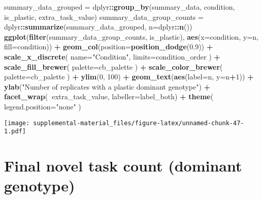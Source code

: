 \documentclass[]{book}
\newenvironment{Shaded}{\begin{snugshade}}{\end{snugshade}}
\newcommand{\DataTypeTok}[1]{\textcolor[rgb]{0.13,0.29,0.53}{#1}}
\newcommand{\DecValTok}[1]{\textcolor[rgb]{0.00,0.00,0.81}{#1}}
\newcommand{\FloatTok}[1]{\textcolor[rgb]{0.00,0.00,0.81}{#1}}
\newcommand{\KeywordTok}[1]{\textcolor[rgb]{0.13,0.29,0.53}{\textbf{#1}}}
\newcommand{\NormalTok}[1]{#1}
\newcommand{\OperatorTok}[1]{\textcolor[rgb]{0.81,0.36,0.00}{\textbf{#1}}}
\newcommand{\StringTok}[1]{\textcolor[rgb]{0.31,0.60,0.02}{#1}}
\begin{document}
\begin{Shaded}
\begin{Highlighting}[]
\NormalTok{summary_data_grouped =}\StringTok{ }\NormalTok{dplyr}\OperatorTok{::}\KeywordTok{group_by}\NormalTok{(summary_data, condition, is_plastic, extra_task_value)}
\NormalTok{summary_data_group_counts =}\StringTok{ }\NormalTok{dplyr}\OperatorTok{::}\KeywordTok{summarize}\NormalTok{(summary_data_grouped, }\DataTypeTok{n=}\NormalTok{dplyr}\OperatorTok{::}\KeywordTok{n}\NormalTok{())}
\KeywordTok{ggplot}\NormalTok{(}\KeywordTok{filter}\NormalTok{(summary_data_group_counts, is_plastic), }\KeywordTok{aes}\NormalTok{(}\DataTypeTok{x=}\NormalTok{condition, }\DataTypeTok{y=}\NormalTok{n, }\DataTypeTok{fill=}\NormalTok{condition)) }\OperatorTok{+}
\StringTok{  }\KeywordTok{geom_col}\NormalTok{(}\DataTypeTok{position=}\KeywordTok{position_dodge}\NormalTok{(}\FloatTok{0.9}\NormalTok{)) }\OperatorTok{+}
\StringTok{  }\KeywordTok{scale_x_discrete}\NormalTok{(}
    \DataTypeTok{name=}\StringTok{"Condition"}\NormalTok{,}
    \DataTypeTok{limits=}\NormalTok{condition_order}
\NormalTok{  ) }\OperatorTok{+}
\StringTok{  }\KeywordTok{scale_fill_brewer}\NormalTok{(}
    \DataTypeTok{palette=}\NormalTok{cb_palette}
\NormalTok{  ) }\OperatorTok{+}
\StringTok{  }\KeywordTok{scale_color_brewer}\NormalTok{(}
    \DataTypeTok{palette=}\NormalTok{cb_palette}
\NormalTok{  ) }\OperatorTok{+}
\StringTok{  }\KeywordTok{ylim}\NormalTok{(}\DecValTok{0}\NormalTok{, }\DecValTok{100}\NormalTok{) }\OperatorTok{+}
\StringTok{  }\KeywordTok{geom_text}\NormalTok{(}\KeywordTok{aes}\NormalTok{(}\DataTypeTok{label=}\NormalTok{n, }\DataTypeTok{y=}\NormalTok{n}\OperatorTok{+}\DecValTok{1}\NormalTok{)) }\OperatorTok{+}
\StringTok{  }\KeywordTok{ylab}\NormalTok{(}\StringTok{"Number of replicates with a plastic dominant genotype"}\NormalTok{) }\OperatorTok{+}
\StringTok{  }\KeywordTok{facet_wrap}\NormalTok{(}\OperatorTok{~}\NormalTok{extra_task_value, }\DataTypeTok{labeller=}\NormalTok{label_both) }\OperatorTok{+}
\StringTok{  }\KeywordTok{theme}\NormalTok{(}
    \DataTypeTok{legend.position=}\StringTok{"none"}
\NormalTok{  )}
\end{Highlighting}
\end{Shaded}

\texttt{[image: supplemental-material\_files/figure-latex/unnamed-chunk-47-1.pdf]}

\hypertarget{final-novel-task-count-dominant-genotype}{%
\section{Final novel task count (dominant genotype)}\label{final-novel-task-count-dominant-genotype}}
\end{document}
